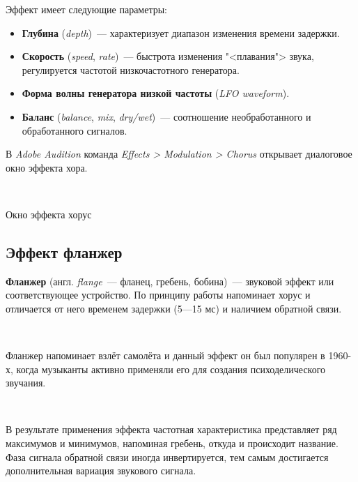 \documentclass{beamer}
\begin{document}
\begin{frame}
  Эффект имеет следующие параметры:
  \begin{itemize}
    \item \textbf{Глубина} (\textit{depth})~--- характеризует диапазон изменения времени задержки.
    \item \textbf{Скорость} (\textit{speed}, \textit{rate})~--- быстрота изменения "<плавания"> звука, регулируется частотой низкочастотного генератора.
    \item \textbf{Форма волны генератора низкой частоты} (\textit{LFO waveform}).
    \item \textbf{Баланс} (\textit{balance}, \textit{mix}, \textit{dry/wet})~--- соотношение необработанного и обработанного сигналов.
  \end{itemize}
\end{frame}

\begin{frame}
  В \emph{Adobe Audition} команда \textit{Effects > Modulation > Chorus} открывает диалоговое окно эффекта хора.

  ~

  \begin{block}{Окно эффекта хорус}
  \end{block}
\end{frame}

\subsection{Эффект фланжер}
\begin{frame}
  \textbf{Фланжер} (англ. \textit{flange}~--- фланец, гребень, бобина)~--- звуковой эффект или соответствующее устройство. По принципу работы напоминает хорус и отличается от него временем задержки (5—15 мс) и наличием обратной связи.

  ~
    
  Фланжер напоминает взлёт самолёта и данный эффект он был популярен в 1960-х, когда музыканты активно применяли его для создания психоделического звучания.
  
  ~
  
  В результате применения эффекта частотная характеристика представляет ряд максимумов и минимумов, напоминая гребень, откуда и происходит название. Фаза сигнала обратной связи иногда инвертируется, тем самым достигается дополнительная вариация звукового сигнала.
\end{frame}
\end{document}
